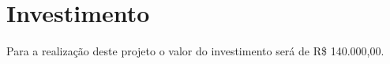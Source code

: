 \chapter[Investimento]{Investimento}

Para a realização deste projeto o valor do investimento será de R\$ 140.000,00.






